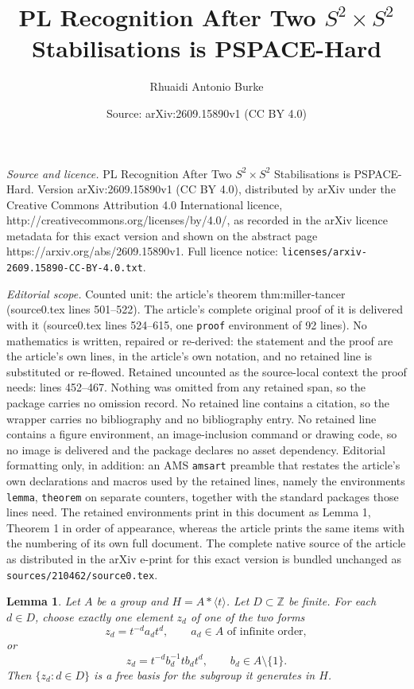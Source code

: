 \documentclass[10pt,a4paper]{amsart}
\title{PL Recognition After Two $S^{2}\times S^{2}$ Stabilisations is PSPACE-Hard}
\author{Rhuaidi Antonio Burke}
\date{Source: arXiv:2609.15890v1 (CC BY 4.0)}
\newtheorem{lemma}{Lemma}
\begin{document}
\maketitle

\noindent\emph{Source and licence.} PL Recognition After Two $S^{2}\times S^{2}$ Stabilisations is PSPACE-Hard. Version arXiv:2609.15890v1 (CC BY 4.0), distributed by arXiv under the Creative Commons Attribution 4.0 International licence, http://creativecommons.org/licenses/by/4.0/, as recorded in the arXiv licence metadata for this exact version and shown on the abstract page https://arxiv.org/abs/2609.15890v1. Full licence notice: \texttt{licenses/arxiv-2609.15890-CC-BY-4.0.txt}.\par\smallskip

\noindent\textit{Editorial scope.} Counted unit: the article's theorem thm:miller-tancer (source0.tex lines 501--522). The article's complete original proof of it is delivered with it (source0.tex lines 524--615, one \texttt{proof} environment of 92 lines). No mathematics is written, repaired or re-derived: the statement and the proof are the article's own lines, in the article's own notation, and no retained line is substituted or re-flowed.  Retained uncounted as the source-local context the proof needs: lines 452--467.  Nothing was omitted from any retained span, so the package carries no omission record.  No retained line contains a citation, so the wrapper carries no bibliography and no bibliography entry.  No retained line contains a figure environment, an image-inclusion command or drawing code, so no image is delivered and the package declares no asset dependency.  Editorial formatting only, in addition: an AMS \texttt{amsart} preamble that restates the article's own declarations and macros used by the retained lines, namely the environments \texttt{lemma}, \texttt{theorem} on separate counters, together with the standard packages those lines need.  The retained environments print in this document as Lemma 1, Theorem 1 in order of appearance, whereas the article prints the same items with the numbering of its own full document.  The complete native source of the article as distributed in the arXiv e-print for this exact version is bundled unchanged as \texttt{sources/210462/source0.tex}.
	\begin{lemma}
		\label{lem:branch-normal-form}
		Let $A$ be a group and $H=A*\langle t\rangle$. Let
		$D\subset\mathbb Z$ be finite. For each $d\in D$, choose exactly one
		element $z_d$ of one of the two forms
		\[
		z_d=t^{-d}a_dt^d,
		\qquad a_d\in A\text{ of infinite order}, \tag{P$_d$}
		\]
		or
		\[
		z_d=t^{-d}b_d^{-1}tb_dt^d,
		\qquad b_d\in A\setminus\{1\}. \tag{Q$_d$}
		\]
		Then $\{z_d:d\in D\}$ is a free basis for the subgroup it generates in $H$.
	\end{lemma}
\end{document}
